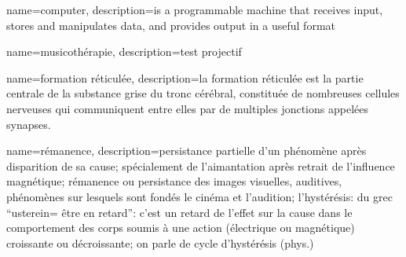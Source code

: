 {
  name=computer,
  description={is a programmable machine that receives input,
               stores and manipulates data, and provides
               output in a useful format}
}

{
  name=musicothérapie,
  description={test projectif}
}


{
  name=formation réticulée,
  description={la formation 
réticulée est la partie centrale de la substance grise du tronc cérébral, 
constituée de nombreuses cellules nerveuses qui communiquent entre elles par de 
multiples jonctions appelées synapses.}
}

{
  name=rémanence,
  description={persistance partielle d'un phénomène après disparition
  de sa cause; spécialement de l'aimantation après retrait de
  l'influence magnétique; rémanence ou persistance des images
  visuelles, auditives, phénomènes sur lesquels sont fondés le cinéma
  et l'audition; l'hystérésis: du grec ``usterein= être en retard'':
  c'est un retard de l'effet sur la cause dans le comportement des
  corps soumis à une action (électrique ou magnétique) croissante ou
  décroissante; on parle de cycle d'hystérésis (phys.)}
}
